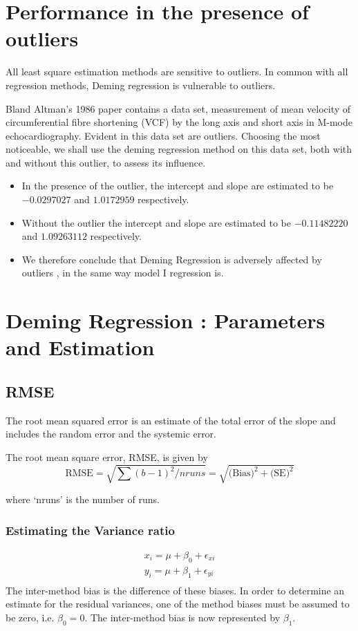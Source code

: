 \documentclass[12pt, a4paper]{report}
\theoremstyle{plain}
\theoremstyle{definition}
\theoremstyle{remark}
\begin{document}
\section{Performance in the presence of outliers}
All least square estimation methods are sensitive to outliers.
In common with all regression methods, Deming regression is vulnerable to outliers. 

Bland Altman's 1986 paper contains a data set, measurement of mean velocity of circumferential fibre shortening (VCF) by the long axis and short axis in M-mode echocardiography. Evident in this data set are outliers. Choosing the most noticeable, we shall use the deming regression method on this data set, both with and
without this outlier, to assess its influence.
\begin{itemize}
	\item In the presence of the outlier, the intercept and slope are estimated to be $-0.0297027$ and $1.0172959$ respectively.
	\item Without the outlier the intercept and slope are estimated to be
	$-0.11482220$ and  $1.09263112$ respectively.
	\item We therefore conclude that Deming Regression is adversely affected
	by outliers , in the same way model I regression is.
\end{itemize}




\section{Deming Regression : Parameters and Estimation}
\subsection{RMSE} 


The root mean squared error is an estimate of the total error of the slope and includes the random error and the systemic error.

The root mean square error, RMSE,  is given by
\begin{equation*}
\mbox{RMSE} = \sqrt{\sum{(b-1)^2/nruns}} =
\sqrt{\mbox{(Bias)}^{2}+ \mbox{(SE)}^{2}}
\end{equation*}

where `nruns' is the number of runs.

\subsubsection{Estimating the Variance ratio}
\begin{eqnarray*}
	x_{i} = \mu +  \beta_{0} + \epsilon_{xi}\\
	y_{i} = \mu +  \beta_{1} + \epsilon_{yi}\\
\end{eqnarray*}
The inter-method bias is the difference of these biases. In order to determine an estimate for the residual variances, one of the method biases must be assumed to be zero, i.e. $\beta_{0} = 0$. The inter-method bias is now represented by $\beta_{1}$.
\end{document}
